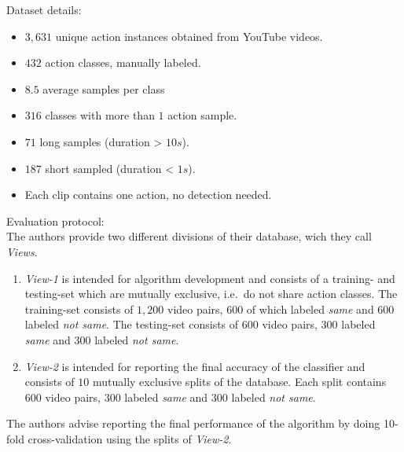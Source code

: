 Dataset details: \cite{kliper-gross_action_2012}
\begin{itemize}
    \item $3,631$ unique action instances obtained from YouTube videos.
    \item $432$ action classes, manually labeled.
    \item $8.5$ average samples per class
    \item $316$ classes with more than $1$ action sample.
    \item $71$ long samples (duration > $10s$).
    \item $187$ short sampled (duration < $1s$).
    \item Each clip contains one action, no detection needed.
\end{itemize}

Evaluation protocol:\\
The authors provide two different divisions of their database, wich they call \textit{Views}.
\begin{enumerate}
    \item \textit{View-1} is intended for algorithm development and consists of a training- and testing-set which are mutually exclusive, i.e.\ do not share action classes.
        The training-set consists of $1,200$ video pairs, $600$ of which labeled \textit{same} and $600$ labeled \textit{not same}.
        The testing-set consists of $600$ video pairs, $300$ labeled \textit{same} and $300$ labeled \textit{not same}.
    \item \textit{View-2} is intended for reporting the final accuracy of the classifier and consists of $10$ mutually exclusive splits of the database.
        Each split contains 600 video pairs, $300$ labeled \textit{same} and $300$ labeled \textit{not same}.
\end{enumerate}
The authors advise reporting the final performance of the algorithm by doing 10-fold cross-validation using the splits of \textit{View-2}.

